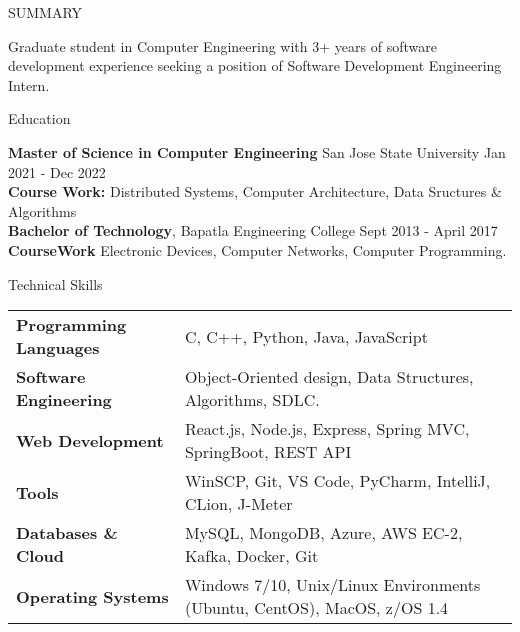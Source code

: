 \documentclass{resume} %
\begin{document}

\begin{rSection}{SUMMARY}

{Graduate student in Computer Engineering with 3+ years of  software development experience seeking a position of Software Development Engineering Intern.}


\end{rSection}
\vspace{-0.5em}
\begin{rSection}{Education}

{\bf Master of Science in Computer Engineering} {San Jose State University} \hfill {Jan 2021 - Dec 2022}\\
{\bf Course Work: }Distributed Systems, Computer Architecture, Data Sructures \& Algorithms\\
{\bf Bachelor of Technology}, Bapatla Engineering College \hfill {Sept 2013 - April 2017}\\
{\bf CourseWork} Electronic Devices, Computer Networks, Computer Programming.  
\end{rSection}

\vspace{-0.5em}
\begin{rSection}{Technical Skills}
\begin{tabular}{ @{} >{\bfseries}l @{\hspace{1ex}} l }
Programming Languages & C, C++, Python, Java, JavaScript\\
Software Engineering & Object-Oriented design, Data Structures, Algorithms, SDLC.\\
Web Development &  React.js, Node.js, Express, Spring MVC, SpringBoot, REST API\\
Tools & WinSCP,  Git, VS Code, PyCharm, IntelliJ, CLion, J-Meter\\
Databases \& Cloud  & MySQL, MongoDB, Azure, AWS EC-2, Kafka, Docker, Git\\
Operating Systems & Windows 7/10, Unix/Linux Environments (Ubuntu, CentOS), MacOS, z/OS 1.4
\end{tabular}
\end{rSection}
\end{document}
